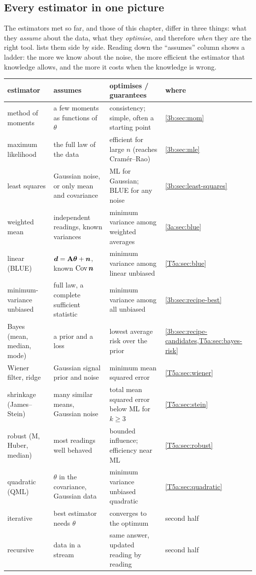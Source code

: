 \subsection{Every estimator in one picture}
\label{T5a:sec:taxonomy}

The estimators met so far, and those of this chapter, differ in three
things: what they \emph{assume} about the data, what they \emph{optimise},
and therefore \emph{when} they are the right tool. 
lists them side by side. Reading down the ``assumes'' column shows a
ladder: the more we know about the noise, the more efficient the estimator
that knowledge allows, and the more it costs when the knowledge is wrong.

\begin{taxonomy}
\label{T5a:tab:taxonomy}
\small
\begin{tabularx}{\linewidth}{@{}p{24mm}XXp{19mm}@{}}
\toprule
estimator & assumes & optimises / guarantees & where\\
\midrule
method of moments & a few moments as functions of $\theta$ & consistency; simple, often a starting point & \cref{3b:sec:mom}\\
maximum likelihood & the full law of the data & efficient for large $n$ (reaches Cram\'er--Rao) & \cref{3b:sec:mle}\\
least squares & Gaussian noise, or only mean and covariance & ML for Gaussian; BLUE for any noise & \cref{3b:sec:least-squares}\\
weighted mean & independent readings, known variances & minimum variance among weighted averages & \cref{3a:sec:blue}\\
linear (BLUE) & $\bm{d}=\mathbf A\bm{\theta}+\bm n$, known $\operatorname{Cov}\bm n$ & minimum variance among linear unbiased & \cref{T5a:sec:blue}\\
minimum-variance unbiased & full law, a complete sufficient statistic & minimum variance among all unbiased & \cref{3b:sec:recipe-best}\\
Bayes (mean, median, mode) & a prior and a loss & lowest average risk over the prior & \cref{3b:sec:recipe-candidates,T5a:sec:bayes-risk}\\
Wiener filter, ridge & Gaussian signal prior and noise & minimum mean squared error & \cref{T5a:sec:wiener}\\
shrinkage (James--Stein) & many similar means, Gaussian noise & total mean squared error below ML for $k\ge3$ & \cref{T5a:sec:stein}\\
robust (M, Huber, median) & most readings well behaved & bounded influence; efficiency near ML & \cref{T5a:sec:robust}\\
quadratic (QML) & $\theta$ in the covariance, Gaussian data & minimum variance unbiased quadratic & \cref{T5a:sec:quadratic}\\
iterative & best estimator needs $\theta$ & converges to the optimum & second half\\
recursive & data in a stream & same answer, updated reading by reading & second half\\
\bottomrule
\end{tabularx}
\end{taxonomy}

